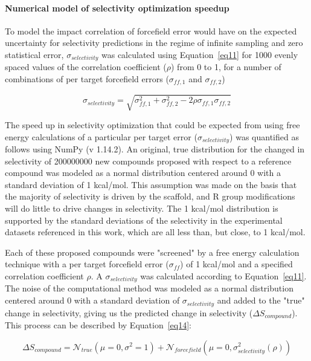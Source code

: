 \documentclass[9pt,lineno]{elife-modified} %
\begin{document}
\paragraph{Numerical model of selectivity optimization speedup}
To model the impact correlation of forcefield error would have on the expected uncertainty for selectivity predictions in the regime of infinite sampling and zero statistical error, $\sigma_{selectivity}$ was calculated using Equation~\ref{eq11} for 1000 evenly spaced values of the correlation coefficient ($\rho$) from 0 to 1, for a number of combinations of per target forcefield errors ($\sigma_{ff,1}$ and $\sigma_{ff,2}$) 

\begin{equation}\label{eq11}
\sigma_{selectivity} = \sqrt{\sigma_{ff,1}^2 + \sigma_{ff,2}^2 - 2\rho\sigma_{ff,1}\sigma_{ff,2}}
\end{equation}

The speed up in selectivity optimization that could be expected from using free energy calculations of a particular per target error ($\sigma_{selectivity}$) was quantified as follows using NumPy (v 1.14.2). An original, true distribution for the changed in selectivity of 200000000 new compounds proposed with respect to a reference compound was modeled as a normal distribution centered around 0 with a standard deviation of 1 kcal/mol. This assumption was made on the basis that the majority of selectivity is driven by the scaffold, and R group modifications will do little to drive changes in selectivity. The 1 kcal/mol distribution is supported by the standard deviations of the selectivity in the experimental datasets referenced in this work, which are all less than, but close, to 1 kcal/mol. 

Each of these proposed compounds were "screened" by a free energy calculation technique with a per target forcefield error ($\sigma_{ff}$) of 1 kcal/mol and a specified correlation coefficient $\rho$. A $\sigma_{selectivity}$ was calculated according to Equation~\ref{eq11}. The noise of the computational method was modeled as a normal distribution centered around 0 with a standard deviation of $\sigma_{selectivity}$ and added to the "true" change in selectivity, giving us the predicted change in selectivity ($\Delta S_{compound}$). This process can be described by Equation~\ref{eq14}: 

\begin{equation}\label{eq14}
\Delta S_{compound} = \mathcal{N}_{true}(\mu =0, \sigma^2 = 1) + \mathcal{N}_{forcefield}(\mu =0, \sigma_{selectivity}^2(\rho))
\end{equation}
\end{document}
